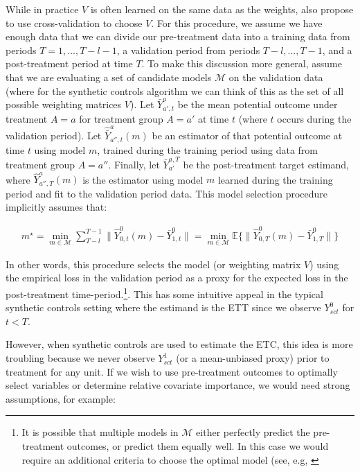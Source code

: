 While in practice $V$ is often learned on the same data as the weights, \cite{abadie2010synthetic} also propose to use cross-validation to choose $V$. For this procedure, we assume we have enough data that we can divide our pre-treatment data into a training data from periods $T = 1, ..., T - l - 1$, a validation period from periods $T - l, ..., T - 1$, and a post-treatment period at time $T$. To make this discussion more general, assume that we are evaluating a set of candidate models $\mathcal{M}$ on the validation data (where for the synthetic controls algorithm we can think of this as the set of all possible weighting matrices $V$). Let $\bar{Y}^a_{a', t}$ be the mean potential outcome under treatment $A = a$ for treatment group $A = a'$ at time $t$ (where $t$ occurs during the validation period). Let $\hat{\bar{Y}}^a_{a'', t}(m)$ be an estimator of that potential outcome at time $t$ using model $m$, trained during the training period using data from treatment group $A = a''$. Finally, let $\bar{Y}_{a'}^{a, T}$ be the post-treatment target estimand, where $\hat{Y}^a_{a'', T}(m)$ is the estimator using model $m$ learned during the training period and fit to the validation period data. This model selection procedure implicitly assumes that:

\begin{align*}
m^\star = \min_{m \in \mathcal{M}}\sum_{T - l}^{T-1}\|\hat{Y}^0_{0, t}(m) - \bar{Y}^0_{1, t}\| = \min_{m \in \mathcal{M}}\mathbb{E}\{\|\hat{Y}^0_{0, T}(m) - \bar{Y}^0_{1, T}\|\}
\end{align*}

In other words, this procedure selects the model (or weighting matrix $V$) using the empirical loss in the validation period as a proxy for the expected loss in the post-treatment time-period.\footnote{It is possible that multiple models in $\mathcal{M}$ either perfectly predict the pre-treatment outcomes, or predict them equally well. In this case we would require an additional criteria to choose the optimal model (see, e.g, \cite{becker2017cross}}. This has some intuitive appeal in the typical synthetic controls setting where the estimand is the ETT since we observe $Y^0_{sct}$ for $t < T$. 

However, when synthetic controls are used to estimate the ETC, this idea is more troubling because we never observe $Y^1_{sct}$ (or a mean-unbiased proxy) prior to treatment for any unit. If we wish to use pre-treatment outcomes to optimally select variables or determine relative covariate importance, we would need strong assumptions, for example:

